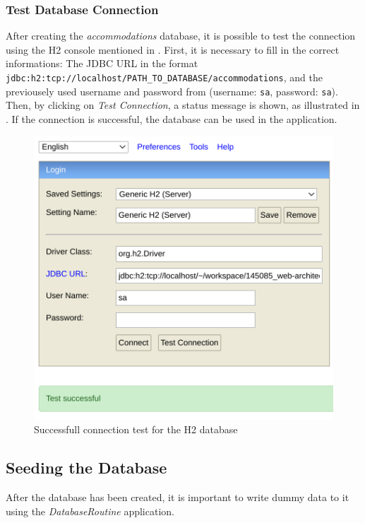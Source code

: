 \subsubsection{Test Database Connection}\label{sec:03_depl_h2_test}
After creating the \textit{accommodations} database, it is possible to test the connection using the H2 console mentioned in .
First, it is necessary to fill in the correct informations: The JDBC URL in the format \texttt{jdbc:h2:tcp://localhost/PATH\_TO\_DATABASE/accommodations}, and the previousely used username and password from  (username: \texttt{sa}, password: \texttt{sa}).
Then, by clicking on \textit{Test Connection}, a status message is shown, as illustrated in . If the connection is successful, the database can be used in the application.
\begin{figure}[h]
\centering
\includegraphics[scale=0.3]{images/03_depl/h2_test}
\caption{Successfull connection test for the H2 database}
\label{fig:03_depl_createdb_h2test}
\end{figure}


\subsection{Seeding the Database}\label{sec:03_depl_seeddb}
After the database has been created, it is important to write dummy data to it using the \textit{DatabaseRoutine} application.


